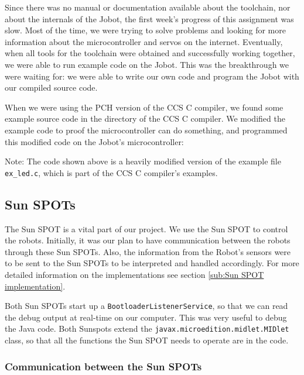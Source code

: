 \documentclass[a4paper,10pt]{article} %
\begin{document}
Since there was no manual or documentation available about the toolchain, nor
about the internals of the Jobot, the first week's progress of this assignment
was slow. Most of the time, we were trying to solve problems and looking for
more information about the microcontroller and servos on the internet.
Eventually, when all tools for the toolchain were obtained and successfully
working together, we were able to run example code on the Jobot. This was the
breakthrough we were waiting for: we were able to write our own code and program
the Jobot with our compiled source code.

When we were using the PCH version of the CCS C compiler, we found some example
source code in the directory of the CCS C compiler. We modified the example code
to proof the microcontroller can do something, and programmed this modified code
on the Jobot's microcontroller:



\noindent Note: The code shown above is a heavily modified version of the
example file \texttt{ex\_led.c}, which is part of the CCS C compiler's examples.



\subsection{Sun SPOTs} %
\label{sec:sunspot}

The Sun SPOT is a vital part of our project. We use the Sun SPOT to control the
robots. Initially, it was our plan to have communication between the robots
through these Sun SPOTs. Also, the information from the Robot's sensors were to
be sent to the Sun SPOTs to be interpreted and handled accordingly. For more
detailed information on the implementations see section \ref{sub:Sun SPOT
implementation}.

Both Sun SPOTs start up a \texttt{BootloaderListenerService}, so that we can
read the debug output at real-time on our computer. This was very useful to
debug the Java code. Both Sunspots extend the
\texttt{javax.microedition.midlet.MIDlet} class, so that all the functions the
Sun SPOT needs to operate are in the code.

\subsubsection{Communication between the Sun SPOTs} %
\label{subsec:comm}
\end{document}

